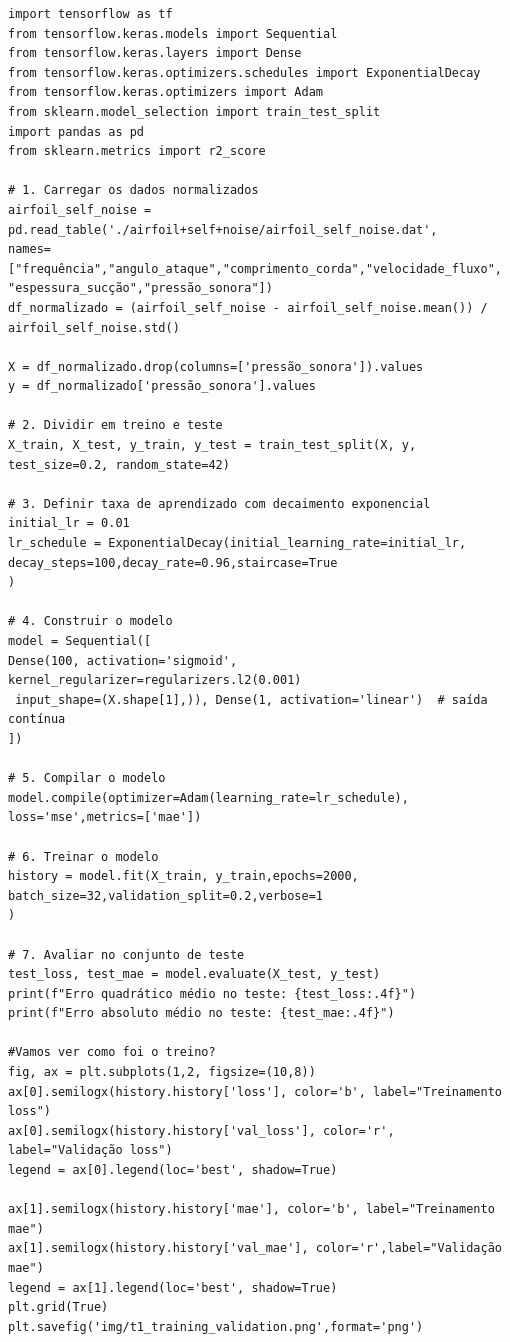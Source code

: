 \documentclass[12pt,a4paper,oneside]{report}
\begin{document}
\begin{lstlisting}[caption={Multi-Layer Perceptron}, label={lst:mpl_impl_all}]
import tensorflow as tf
from tensorflow.keras.models import Sequential
from tensorflow.keras.layers import Dense
from tensorflow.keras.optimizers.schedules import ExponentialDecay
from tensorflow.keras.optimizers import Adam
from sklearn.model_selection import train_test_split
import pandas as pd
from sklearn.metrics import r2_score

# 1. Carregar os dados normalizados
airfoil_self_noise = pd.read_table('./airfoil+self+noise/airfoil_self_noise.dat',
names=["frequência","angulo_ataque","comprimento_corda","velocidade_fluxo",
"espessura_sucção","pressão_sonora"])
df_normalizado = (airfoil_self_noise - airfoil_self_noise.mean()) / airfoil_self_noise.std()

X = df_normalizado.drop(columns=['pressão_sonora']).values
y = df_normalizado['pressão_sonora'].values

# 2. Dividir em treino e teste
X_train, X_test, y_train, y_test = train_test_split(X, y, test_size=0.2, random_state=42)

# 3. Definir taxa de aprendizado com decaimento exponencial
initial_lr = 0.01
lr_schedule = ExponentialDecay(initial_learning_rate=initial_lr,
decay_steps=100,decay_rate=0.96,staircase=True
)

# 4. Construir o modelo
model = Sequential([
Dense(100, activation='sigmoid', kernel_regularizer=regularizers.l2(0.001)
 input_shape=(X.shape[1],)), Dense(1, activation='linear')  # saída contínua
])

# 5. Compilar o modelo
model.compile(optimizer=Adam(learning_rate=lr_schedule),
loss='mse',metrics=['mae'])

# 6. Treinar o modelo
history = model.fit(X_train, y_train,epochs=2000,
batch_size=32,validation_split=0.2,verbose=1
)

# 7. Avaliar no conjunto de teste
test_loss, test_mae = model.evaluate(X_test, y_test)
print(f"Erro quadrático médio no teste: {test_loss:.4f}")
print(f"Erro absoluto médio no teste: {test_mae:.4f}")

#Vamos ver como foi o treino?
fig, ax = plt.subplots(1,2, figsize=(10,8))
ax[0].semilogx(history.history['loss'], color='b', label="Treinamento loss")
ax[0].semilogx(history.history['val_loss'], color='r', label="Validação loss")
legend = ax[0].legend(loc='best', shadow=True)

ax[1].semilogx(history.history['mae'], color='b', label="Treinamento mae")
ax[1].semilogx(history.history['val_mae'], color='r',label="Validação mae")
legend = ax[1].legend(loc='best', shadow=True)
plt.grid(True)
plt.savefig('img/t1_training_validation.png',format='png')


\end{lstlisting}
\end{document}

